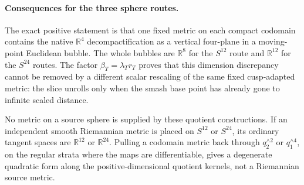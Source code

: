\paragraph{Consequences for the three sphere routes.}
The exact positive statement is that one fixed metric on each compact
codomain contains the native \(\mathbb R^4\) decompactification as a
vertical four-plane in a moving-point Euclidean bubble.  The whole bubbles
are \(\mathbb R^8\) for the \(S^{12}\) route and \(\mathbb R^{12}\) for the
\(S^{24}\) routes.  The factor \(\beta_T=\lambda_Tr_T\) proves that this
dimension discrepancy cannot be removed by a different scalar rescaling
of the same fixed cusp-adapted metric: the slice unrolls only when the
smash base point has already gone to infinite scaled distance.

No metric on a source sphere is supplied by these quotient constructions.
If an independent smooth Riemannian metric is placed on \(S^{12}\) or
\(S^{24}\), its ordinary tangent spaces are \(\mathbb R^{12}\) or
\(\mathbb R^{24}\).  Pulling a codomain metric back through
\(q_2^{\wedge2}\) or \(q_1^{\wedge4}\), on the regular strata where the
maps are differentiable, gives a degenerate quadratic form along the
positive-dimensional quotient kernels, not a Riemannian source metric.

